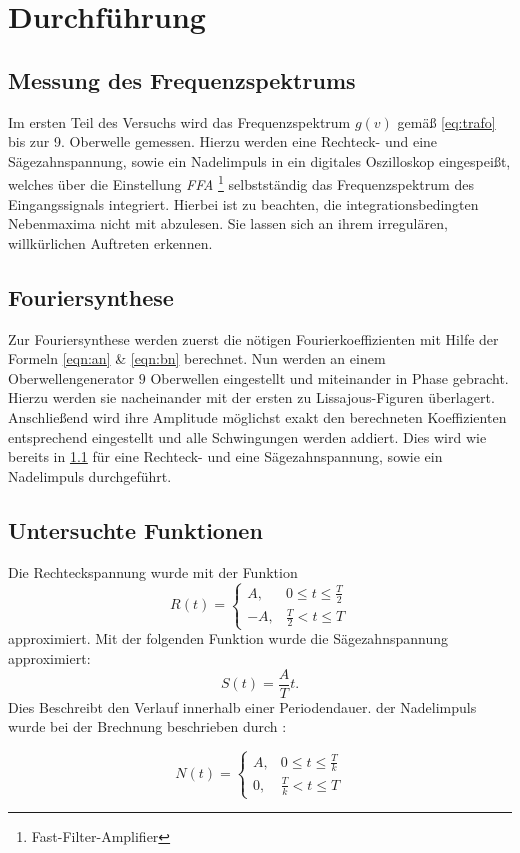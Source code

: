 \section{Durchführung}
\label{sec:Durchführung}

\subsection{Messung des Frequenzspektrums}
\label{sec:Messung}
Im ersten Teil des Versuchs wird das Frequenzspektrum $g(v)$ gemäß \eqref{eq:trafo} bis zur 9. Oberwelle gemessen.
Hierzu werden eine Rechteck- und eine Sägezahnspannung, sowie ein Nadelimpuls in ein digitales Oszilloskop eingespeißt, welches über die Einstellung \textit{FFA}
\footnote{Fast-Filter-Amplifier} selbstständig
das Frequenzspektrum des Eingangssignals integriert. Hierbei ist zu beachten, die integrationsbedingten Nebenmaxima nicht mit abzulesen. Sie lassen sich an ihrem irregulären,
willkürlichen Auftreten erkennen.


\subsection{Fouriersynthese}
\label{sec:Synthese}
Zur Fouriersynthese werden zuerst die nötigen Fourierkoeffizienten mit Hilfe der Formeln \eqref{eqn:an} \& \eqref{eqn:bn} berechnet.
Nun werden an einem Oberwellengenerator $9$ Oberwellen eingestellt und miteinander in Phase gebracht. Hierzu werden sie nacheinander mit der ersten zu Lissajous-Figuren überlagert.
Anschließend wird ihre Amplitude möglichst exakt den berechneten Koeffizienten entsprechend eingestellt und alle Schwingungen werden addiert. Dies wird wie bereits in \ref{sec:Messung}
für eine Rechteck- und eine Sägezahnspannung, sowie ein Nadelimpuls durchgeführt.
\subsection{Untersuchte Funktionen}
Die Rechteckspannung wurde mit der Funktion
\begin{equation}
  R(t)=
  \begin{cases}
    A , & 0 \leq t \leq \frac{T}{2} \\
    -A , & \frac{T}{2} < t \leq T
  \end{cases}
\label{eqn:recht}
\end{equation}
approximiert.
Mit der folgenden Funktion wurde die Sägezahnspannung approximiert:
\begin{equation}
  S(t)= \frac{A}{T} t.
  \label{eqn:säge}
\end{equation}
Dies Beschreibt den Verlauf innerhalb einer Periodendauer. der Nadelimpuls wurde bei der Brechnung beschrieben durch :

\begin{equation}
  N(t)=
  \begin{cases}
    A ,& 0 \leq t \leq \frac{T}{k} \\
    0 , & \frac{T}{k} < t \leq T
  \end{cases}
\label{eqn:nadel}
\end{equation}
